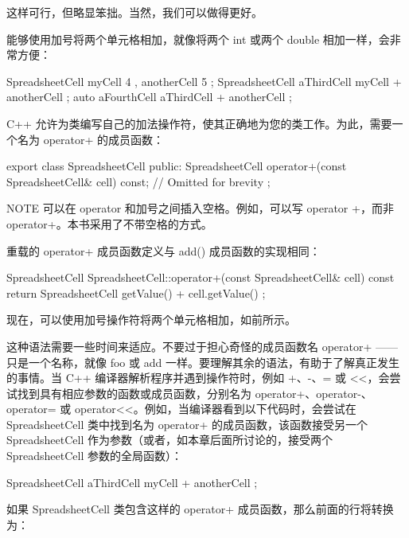 这样可行，但略显笨拙。当然，我们可以做得更好。


能够使用加号将两个单元格相加，就像将两个 int 或两个 double 相加一样，会非常方便：

\begin{cpp}
SpreadsheetCell myCell { 4 }, anotherCell { 5 };
SpreadsheetCell aThirdCell { myCell + anotherCell };
auto aFourthCell { aThirdCell + anotherCell };
\end{cpp}

C++ 允许为类编写自己的加法操作符，使其正确地为您的类工作。为此，需要一个名为 operator+ 的成员函数：

\begin{cpp}
export class SpreadsheetCell
{
    public:
        SpreadsheetCell operator+(const SpreadsheetCell& cell) const;
        // Omitted for brevity
};
\end{cpp}

\begin{myNotic}{NOTE}
可以在 operator 和加号之间插入空格。例如，可以写 operator +，而非 operator+。本书采用了不带空格的方式。
\end{myNotic}

重载的 operator+ 成员函数定义与 add() 成员函数的实现相同：

\begin{cpp}
SpreadsheetCell SpreadsheetCell::operator+(const SpreadsheetCell& cell) const
{
    return SpreadsheetCell { getValue() + cell.getValue() };
}
\end{cpp}

现在，可以使用加号操作符将两个单元格相加，如前所示。

这种语法需要一些时间来适应。不要过于担心奇怪的成员函数名 operator+ ——只是一个名称，就像 foo 或 add 一样。要理解其余的语法，有助于了解真正发生的事情。当 C++ 编译器解析程序并遇到操作符时，例如 +、-、= 或 <{}<，会尝试找到具有相应参数的函数或成员函数，分别名为 operator+、operator-、operator= 或 operator<{}<。例如，当编译器看到以下代码时，会尝试在 SpreadsheetCell 类中找到名为 operator+ 的成员函数，该函数接受另一个 SpreadsheetCell 作为参数（或者，如本章后面所讨论的，接受两个 SpreadsheetCell 参数的全局函数）：

\begin{cpp}
SpreadsheetCell aThirdCell { myCell + anotherCell };
\end{cpp}

如果 SpreadsheetCell 类包含这样的 operator+ 成员函数，那么前面的行将转换为：


